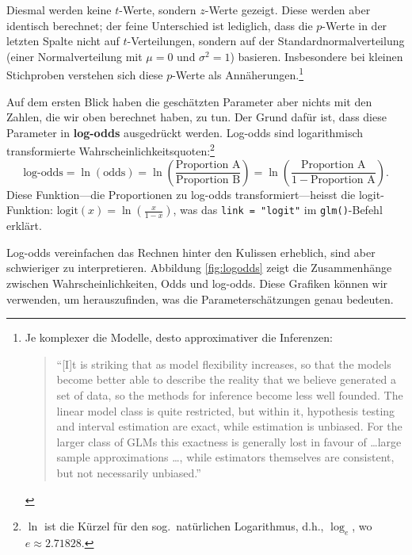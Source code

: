 \documentclass[oneside, 10pt]{book}\usepackage[]{graphicx}\usepackage[]{xcolor}
\begin{document}
Diesmal werden keine $t$-Werte, sondern $z$-Werte gezeigt.
Diese werden aber identisch berechnet; der feine Unterschied
ist lediglich, dass die $p$-Werte in der letzten Spalte
nicht auf $t$-Verteilungen, sondern auf der Standardnormalverteilung
(einer Normalverteilung mit $\mu = 0$ und $\sigma^2 = 1$) basieren.
Insbesondere bei kleinen Stichproben verstehen sich diese $p$-Werte
als Annäherungen.\footnote{Je komplexer die Modelle, desto
approximativer die Inferenzen:
\begin{quote}
``[I]t is striking that as model flexibility increases, so that the models
become better able to describe the reality that we believe generated a
set of data, so the methods for inference become less well founded.
The linear model class is quite restricted, but within it, hypothesis
testing and interval estimation are exact, while estimation is
unbiased. For the larger class of GLMs this exactness is generally lost
in favour of \dots large sample approximations \dots, while estimators
themselves are consistent, but not necessarily unbiased.'' \citep[][xvi--xvii]{Wood2006}
\end{quote}
}
 
Auf dem ersten Blick haben die geschätzten Parameter aber
nichts mit den Zahlen, die wir oben berechnet haben, zu tun.
Der Grund dafür ist, dass diese Parameter in \textbf{log-odds}
ausgedrückt werden. Log-odds sind logarithmisch transformierte
Wahrscheinlichkeitsquoten:\footnote{$\ln$ ist die Kürzel für den sog.\ natürlichen Logarithmus, d.h., $\log_{e}$, wo $e \approx 2.71828$.}
\begin{equation}\label{eq:logodds}
\textrm{log-odds} = \ln \left(\textrm{odds}\right) = \ln \left(\frac{\textrm{Proportion A}}{\textrm{Proportion B}}\right) = \ln \left(\frac{\textrm{Proportion A}}{1 - \textrm{Proportion A}}\right).
\end{equation}
Diese Funktion---die Proportionen zu log-odds transformiert---heisst 
die logit-Funktion: $\textrm{logit}(x) = \ln \left(\frac{x}{1-x}\right)$,
was das \texttt{link = "logit"} im \texttt{glm()}-Befehl
erklärt.

Log-odds vereinfachen das Rechnen hinter den Kulissen erheblich,
sind aber schwieriger zu interpretieren.
Abbildung \ref{fig:logodds} zeigt die
Zusammenhänge zwischen Wahrscheinlichkeiten,
Odds und log-odds. Diese Grafiken können
wir verwenden, um herauszufinden, was die
Parameterschätzungen genau bedeuten.
\end{document}
